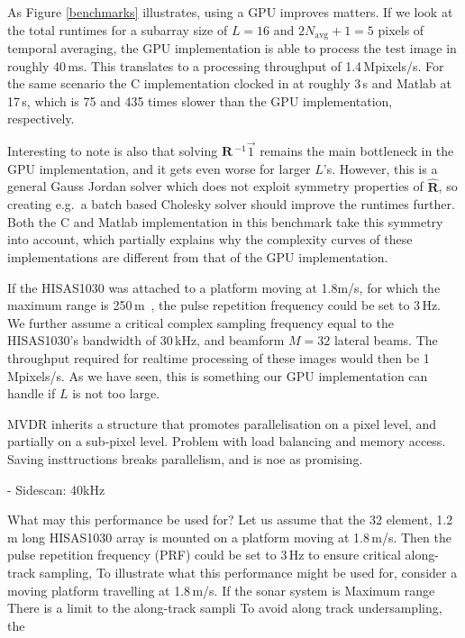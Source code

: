 \documentclass[12pt,journal,captionsoff,onecolumn]{IEEEtran}
\newcommand\mat[1]{\boldsymbol{#1}}
\newcommand\1{\vec 1}
\newcommand*\eR{\mat{\hat R}}
\newcommand*\eRi{\hat{\mat R}\,\!^{-1}}
\begin{document}
As Figure \ref{benchmarks} illustrates, using a \gls{GPU} improves matters. If we look at the total runtimes for a subarray size of $L=16$ and $2N_\text{avg}+1=5$ pixels of temporal averaging, the \gls{GPU} implementation is able to process the test image in roughly 40\,ms. This translates to a processing throughput of 1.4\,Mpixels/s. For the same scenario the C implementation clocked in at roughly 3\,s and Matlab at 17\,s, which is 75 and 435 times slower than the \gls{GPU} implementation, respectively.

Interesting to note is also that solving $\eRi\1$ remains the main bottleneck in the \gls{GPU} implementation, and it gets even worse for larger $L$'s. However, this is a general Gauss Jordan solver which does not exploit symmetry properties of $\eR$, so creating e.g.\ a batch based Cholesky solver should improve the runtimes further. Both the C and Matlab implementation in this benchmark take this symmetry into account, which partially explains why the complexity curves of these implementations are different from that of the \gls{GPU} implementation.

If the HISAS1030 was attached to a platform moving at 1.8m/s, for which the maximum range is 250\,m~\cite{Hansen2010}, the pulse repetition frequency could be set to 3\,Hz. We further assume a critical complex sampling frequency equal to the HISAS1030's bandwidth of 30\,kHz, and beamform $M=32$ lateral beams. The throughput required for realtime processing of these images would then be 1\,Mpixels/s. As we have seen, this is something our \gls{GPU} implementation can handle if $L$ is not too large.%

MVDR inherits a structure that promotes parallelisation on a pixel level, and partially on a sub-pixel level. Problem with load balancing and memory access. Saving insttructions breaks parallelism, and is noe as promising.

- Sidescan: 40kHz 

What may this performance be used for? Let us assume that the 32 element, 1.2\,m long HISAS1030 array is mounted on a platform moving at 1.8\,m/s. Then the pulse repetition frequency (PRF) could be set to 3\,Hz to ensure critical along-track sampling, 
To illustrate what this performance might be used for, consider a moving platform travelling at 1.8\,m/s. 
If the sonar system is Maximum range 
There is a limit to the along-track sampli
To avoid along track undersampling, the 
\end{document}
